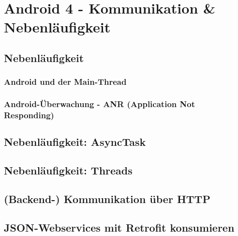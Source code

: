 \documentclass[a4paper]{article}
\begin{document}
\section{Android 4 - Kommunikation \& Nebenläufigkeit}

\subsection{Nebenläufigkeit}

	\subsubsection{Android und der Main-Thread}


	\subsubsection{Android-Überwachung - ANR (Application Not Responding)}

	
\subsection{Nebenläufigkeit: AsyncTask}

	
\subsection{Nebenläufigkeit: Threads}


\subsection{(Backend-) Kommunikation über HTTP}

	
\subsection{JSON-Webservices mit Retrofit konsumieren}

	
\end{document}
